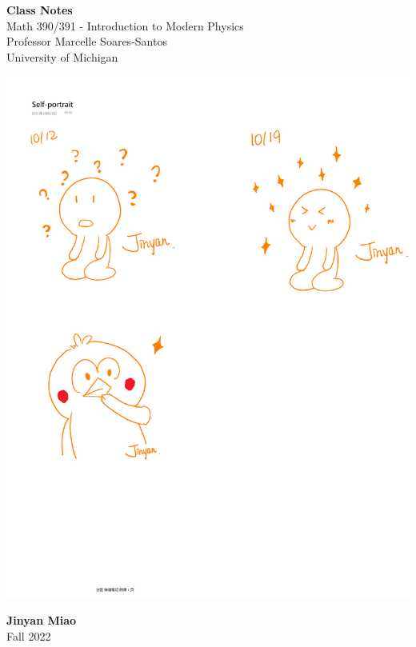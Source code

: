 \documentclass[11pt]{article}
\theoremstyle{break}
\theoremstyle{break}
\begin{document}
	\begin{titlepage}
		\begin{center}
			\vspace*{1cm}
			\Huge \color{red}
				\textbf{Class Notes}\\
			\vspace{0.5cm}			
			\Large \color{black}
				Math 390/391 - Introduction to Modern Physics\\
				Professor Marcelle Soares-Santos\\	
				University of Michigan\\
			\vspace{2cm}

			\includegraphics[scale=0.88]{hmm.pdf}
			
			
			\vspace{4cm}
			\LARGE
				\textbf{Jinyan Miao}\\
				\hfill\break
				\LARGE Fall 2022\\
			\vspace{1cm}

		\vspace*{\fill}
		\end{center}			
	\end{titlepage}
\end{document}
